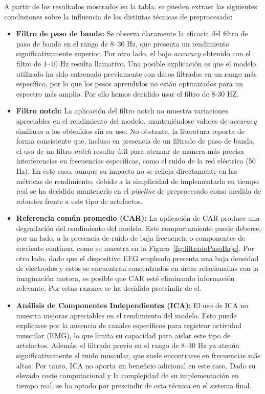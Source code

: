 A partir de los resultados mostrados en la tabla, se pueden extraer las siguientes conclusiones sobre la influencia de las distintas técnicas de preprocesado:

\begin{itemize}

\item \textbf{Filtro de paso de banda:} Se observa claramente la eficacia del filtro de paso de banda en el rango de 8--30 Hz, que presenta un rendimiento significativamente superior. Por otro lado, el bajo \textit{accuracy} obtenido con el filtro de 1--40 Hz resulta llamativo. Una posible explicación es que el modelo utilizado ha sido entrenado previamente con datos filtrados en un rango más específico, por lo que los pesos aprendidos no están optimizados para un espectro más amplio. Por ello hemos decidido usar el filtro de 8-30 HZ.

\item \textbf{Filtro notch:} La aplicación del filtro notch no muestra variaciones apreciables en el rendimiento del modelo, manteniéndose valores de \textit{accuracy} similares a los obtenidos sin su uso. No obstante, la literatura reporta de forma consistente que, incluso en presencia de un filtrado de paso de banda, el uso de un filtro \textit{notch} resulta útil para atenuar de manera más precisa interferencias en frecuencias específicas, como el ruido de la red eléctrica (50 Hz). En este caso, aunque su impacto no se refleja directamente en las métricas de rendimiento, debido a la simplicidad de implementarlo en tiempo real se ha decidido mantenerlo en el \textit{pipeline} de preprocesado como medida de robustez frente a este tipo de artefactos.

\item \textbf{Referencia común promedio (CAR):} La aplicación de CAR produce una degradación del rendimiento del modelo. Este comportamiento puede deberse, por un lado, a la presencia de ruido de baja frecuencia o componentes de corriente continua, como se muestra en la Figura~\ref{fig:filtradoPasoBajo}. Por otro lado, dado que el dispositivo EEG empleado presenta una baja densidad de electrodos y estos se encuentran concentrados en áreas relacionadas con la imaginación motora, es posible que CAR esté eliminando información relevante. Por estas razones se ha decidido prescindir de el. 

\item \textbf{Análisis de Componentes Independientes (ICA):} El uso de ICA no muestra mejoras apreciables en el rendimiento del modelo. Esto puede explicarse por la ausencia de canales específicos para registrar actividad muscular (EMG), lo que limita su capacidad para aislar este tipo de artefactos. Además, el filtrado previo en el rango de 8--30 Hz ya atenúa significativamente el ruido muscular, que suele encontrarse en frecuencias más altas. Por tanto, ICA no aporta un beneficio adicional en este caso. Dado su elevado coste computacional y la complejidad de su implementación en tiempo real, se ha optado por prescindir de esta técnica en el sistema final.

\end{itemize}